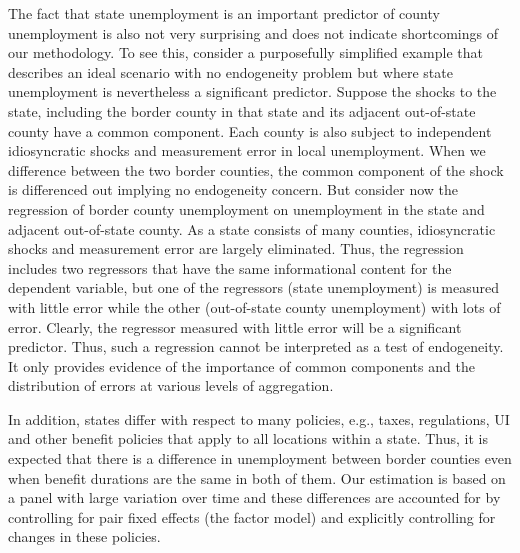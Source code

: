 \documentclass[12pt]{article}
\newcommand{\1}{\mathbf{1}}
\begin{document}
\begin{appendix}
The fact that state unemployment is an important predictor of county unemployment is also not very surprising and does not indicate shortcomings of our methodology. To see this, consider a purposefully simplified example that describes an ideal scenario with no endogeneity problem but where state unemployment is nevertheless a significant predictor. Suppose the shocks to the state, including the border county in that state and its adjacent out-of-state county have a common component. Each county is also subject to independent idiosyncratic shocks and measurement error in local unemployment. When we difference between the two border counties, the common component of the shock is differenced out implying no endogeneity concern. But consider now the regression of border county unemployment on unemployment in the state and adjacent out-of-state county. As a state consists of many counties, idiosyncratic shocks and measurement error are largely eliminated. Thus, the regression includes two regressors that have the same informational content for the dependent variable, but one of the regressors (state unemployment) is measured with little error while the other (out-of-state county unemployment) with lots of error. Clearly, the regressor measured with little error will be a significant predictor. Thus, such a regression cannot be interpreted as a test of endogeneity. It only provides evidence of the importance of common components and the distribution of errors at various levels of aggregation.

In addition, states differ with respect to many policies, e.g., taxes, regulations, UI and other benefit policies that apply to all locations within a state. Thus, it is expected that there is a difference in unemployment between border counties even when benefit durations are the same in both of them. Our estimation is based on a panel with large variation over time and these differences are accounted for by controlling for pair fixed effects (the factor model) and explicitly controlling for changes in these policies.


\end{appendix}
\end{document}
